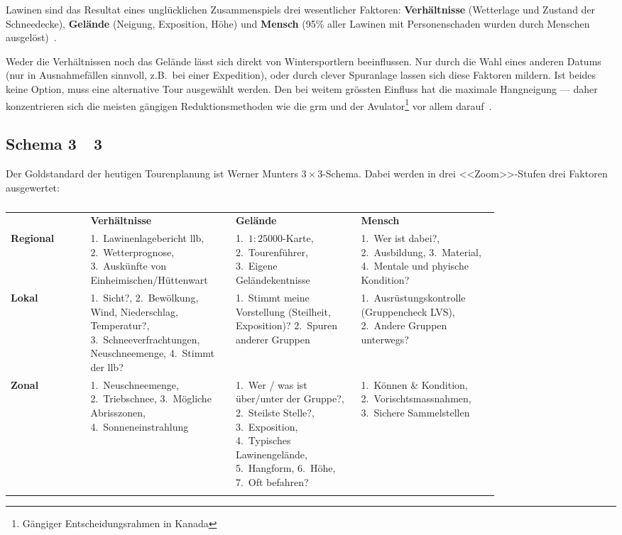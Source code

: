 Lawinen sind das Resultat eines unglücklichen Zusammenspiels drei wesentlicher Faktoren: 
\textbf{Verhältnisse} (Wetterlage und Zustand der Schneedecke), \textbf{Gelände} (Neigung, Exposition, Höhe) und \textbf{Mensch} (95\% aller Lawinen mit Personenschaden wurden durch Menschen ausgelöst)~\cite{ortovoxlabsnow}.

Weder die Verhältnissen noch das Gelände lässt sich direkt von Wintersportlern beeinflussen. Nur durch die Wahl eines anderen Datums (nur in Ausnahmefällen sinnvoll, z.B.\ bei einer Expedition), oder durch clever Spuranlage lassen sich diese Faktoren mildern. 
Ist beides keine Option, muss eine alternative Tour ausgewählt werden.
Den bei weitem grössten Einfluss hat die maximale Hangneigung --- daher konzentrieren sich die meisten gängigen Reduktionsmethoden wie die \gls{grm} und der Avulator\footnote{Gängiger Entscheidungsrahmen in Kanada} vor allem darauf~\cite{arpddatasetdocs}\cite{harveyrhynerschweizerlawinenkunde}.
\clearpage
\subsection{Schema 3~\texttimes~3}
Der Goldstandard der heutigen Tourenplanung ist Werner Munters $3\times3$-Schema. Dabei werden in drei <<Zoom>>-Stufen drei Faktoren ausgewertet:


\begin{table}[hb] 
  \centering
  \begin{tabular}{|p{0.14\linewidth} | p{0.22\linewidth} | p{0.22\linewidth} | p{0.22\linewidth} |}
    \hhline{|----|}
   &  \textbf{Verhältnisse} & \textbf{Gelände} & \textbf{Mensch} \\
   \hhline{t:----:t}
  \textbf{Regional} &  1.~Lawinenlagebericht \gls{llb}, 2.~Wetterprognose, 3.~Auskünfte von Einheimischen/Hüttenwart &  1.~$1:25000$-Karte, 2.~Tourenführer, 3.~Eigene Geländekentnisse & 1.~Wer ist dabei?, 2.~Ausbildung, 3.~Material, 4.~Mentale und phyische Kondition?  \\ \hhline{|----|}
  \textbf{Lokal} & 1.~Sicht?, 2.~Bewölkung, Wind, Niederschlag, Temperatur?, 3.~Schneeverfrachtungen, Neuschneemenge, 4.~Stimmt der \gls{llb}? & 1.~Stimmt meine Vorstellung (Steilheit, Exposition)? 2.~Spuren anderer Gruppen & 1.~Ausrüstungskontrolle (Gruppencheck LVS), 2.~Andere Gruppen unterwegs? \\ \hhline{|----|}
  \textbf{Zonal} & 1.~Neuschneemenge, 2.~Triebschnee, 3.~Mögliche Abrisszonen, 4.~Sonneneinstrahlung & 1.~Wer / was ist über/unter der Gruppe?, 2.~Steilste Stelle?, 3.~Exposition, 4.~Typisches Lawinengelände, 5.~Hangform, 6.~Höhe, 7.~Oft befahren? & 1.~Können \& Kondition, 2.~Vorischtsmassnahmen, 3.~Sichere Sammelstellen \\
  \hhline{b:----:b}
  \end{tabular}
  \caption{}\label{tab:3x3table}
\end{table}

